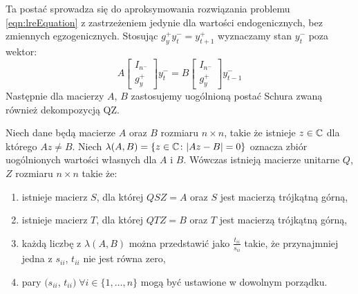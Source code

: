 Ta postać sprowadza się do aproksymowania rozwiązania problemu \eqref{eqn:lreEquation} z zastrzeżeniem jedynie dla wartości endogenicznych, bez zmiennych egzogenicznych. Stosując $g_y^+ y_t^- = y^+_{t+1}$ wyznaczamy stan $y_t^-$ poza wektor:
\begin{equation}
    A
    \begin{bmatrix}
        I_{n^-} \\
        g_y^+
    \end{bmatrix}  y_t^- = 
    B
    \begin{bmatrix}
        I_{n^-} \\
        g_y^+
    \end{bmatrix} y^-_{t-1}
\end{equation}
Następnie dla macierzy $A$, $B$ zastosujemy uogólnioną postać Schura zwaną również dekompozycją QZ.

\begin{theorem}
\label{theorem:schur}

Niech dane będą macierze $A$ oraz $B$ rozmiaru $n \times n$, takie że istnieje $z \in \mathbb{C}$ dla którego $A z \neq B$. Niech $\lambda(A, B) = \left\{z \in \mathbb{C} \colon |A z - B| = 0\right\}$ oznacza zbiór uogólnionych wartości własnych dla $A$ i $B$. Wówczas istnieją macierze unitarne $Q$, $Z$ rozmiaru $n \times n$ takie że:
\begin{enumerate}
    \item istnieje macierz $S$, dla której $QSZ = A$ oraz $S$ jest macierzą trójkątną górną,
    \item istnieje macierz $T$, dla której $QTZ = B$ oraz $T$ jest macierzą trójkątną górną,
    \item każdą liczbę z $\lambda(A, B)$ można przedstawić jako $\frac{t_{ii}}{s_{ii}}$ takie, że przynajmniej jedna z $s_{ii}$, $t_{ii}$ nie jest równa zero,
    \item pary $(s_{ii}$, $t_{ii})\;\forall i \in \{1,\dots, n\}$ mogą być ustawione w dowolnym porządku.
\end{enumerate}
\end{theorem}

